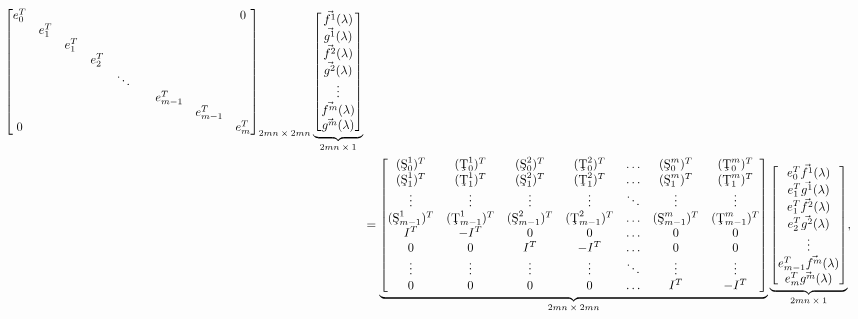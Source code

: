 \documentclass[10pt,reqno,oneside,a4paper]{article}
\begin{document}
\begin{align}
{\begin{bmatrix}
e^T_0 & & & & & & & & 0 \\
& e^T_1 & & & & & & & \\
& & e^T_1 & & & & & & \\
& & & e^T_2 & & & & & \\
& & & & \ddots & & & & \\
& & & & & & e^T_{m-1} & & \\
& & & & & & & e^T_{m-1} & \\
0& & & & & & & & e^T_{m}
\end{bmatrix}}_\text{$2mn \times 2mn$}\underbrace{\begin{bmatrix}
\vec{f^1}(\lambda) \\ \vec{g^1}(\lambda) \\
\vec{f^2}(\lambda) \\ \vec{g^2}(\lambda) \\
\vdots \\
\vec{f^m}(\lambda) \\ \vec{g^m}(\lambda) 
\end{bmatrix}}_\text{$2mn\times 1$}& \nonumber\\
&=\underbrace{\begin{bmatrix}
(\textup{\c{S}}^1_0)^T & (\textup{\c{T}}^1_0)^T  & (\textup{\c{S}}^2_0)^T & (\textup{\c{T}}^2_0)^T & \ldots & (\textup{\c{S}}^m_0)^T & (\textup{\c{T}}^m_0)^T \\
(\textup{\c{S}}^1_1)^T &  (\textup{\c{T}}^1_1)^T & (\textup{\c{S}}^2_1)^T & (\textup{\c{T}}^2_1)^T & \ldots  & (\textup{\c{S}}^m_1)^T & (\textup{\c{T}}^m_1)^T \\
\vdots & \vdots & \vdots & \vdots & \ddots & \vdots & \vdots \\
(\textup{\c{S}}^1_{m-1})^T & (\textup{\c{T}}^1_{m-1})^T & (\textup{\c{S}}^2_{m-1})^T & (\textup{\c{T}}^2_{m-1})^T & \ldots & (\textup{\c{S}}^m_{m-1})^T & (\textup{\c{T}}^m_{m-1})^T \\
I^T & -I^T & 0 & 0 & \ldots & 0 & 0  \\
0 & 0 & I^T & -I^T & \ldots & 0 & 0  \\
\vdots & \vdots & \vdots &  \vdots & \ddots & \vdots & \vdots \\
0 & 0 & 0 & 0 & \ldots & I^T & -I^T
\end{bmatrix}}_\text{$2mn\times 2mn$}
\underbrace{\begin{bmatrix}
e^T_0\vec{f^1}(\lambda) \\ e^T_1\vec{g^1}(\lambda) \\
e^T_1\vec{f^2}(\lambda) \\ e^T_2\vec{g^2}(\lambda) \\
\vdots \\
e^T_{m-1}\vec{f^m}(\lambda) \\ e^T_m\vec{g^m}(\lambda) 
\end{bmatrix}}_\text{$2mn\times 1$},& \label{DtN.A-eqn2}
\end{align}
\end{document}
